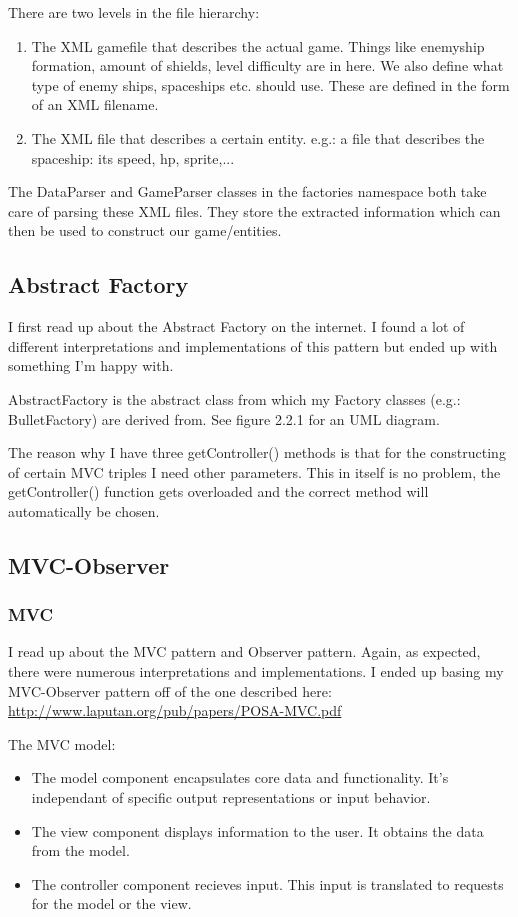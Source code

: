\documentclass[11pt, a4paper]{article}
\begin{document}
There are two levels in the file hierarchy: 
\begin{enumerate}
\item The XML gamefile that describes the actual game. Things like enemyship formation, amount of shields, level difficulty are in here. 
We also define what type of enemy ships, spaceships etc. should use. These are defined in the form of an XML filename.
\item The XML file that describes a certain entity. e.g.: a file that describes the spaceship: its speed, hp, sprite,...
\end{enumerate}

The DataParser and GameParser classes in the factories namespace both take care of parsing these XML files. They store the extracted information which can then be used to construct our game/entities.
\subsection{Abstract Factory}
I first read up about the Abstract Factory on the internet. I found a lot of different interpretations and implementations of this pattern but ended up with something I'm happy with.

AbstractFactory is the abstract class from which my Factory classes (e.g.: BulletFactory) are derived from.
See figure 2.2.1 for an UML diagram.

The reason why I have three getController() methods is that for the constructing of certain MVC triples I need other parameters. This in itself is no problem, the getController() function gets overloaded and the correct method
will automatically be chosen.
\subsection{MVC-Observer}
\subsubsection{MVC}
I read up about the MVC pattern and Observer pattern. Again, as expected, there were numerous interpretations and implementations. I ended up basing my MVC-Observer pattern off of the one described here: \url{http://www.laputan.org/pub/papers/POSA-MVC.pdf}

The MVC model:
\begin{itemize}
\item The model component encapsulates core data and functionality. It's independant of specific output representations or input behavior.
\item The view component displays information to the user. It obtains the data from the model.
\item The controller component recieves input. This input is translated to requests for the model or the view.
\end{itemize}
\end{document}
